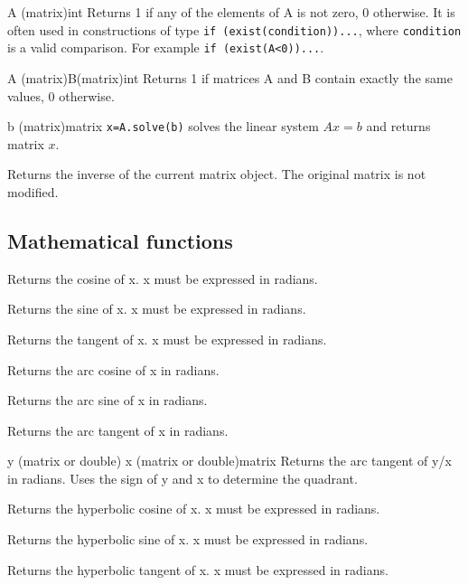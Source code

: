 {A (matrix)}{int}
{Returns 1 if any of the elements of A is not zero, 0 otherwise. It is often used in constructions
of type \texttt{if (exist(condition))...}, where \texttt{condition} is a valid comparison. For example
\texttt{if (exist(A<0))...}.}

{A (matrix)\newline B(matrix)}{int}
{Returns 1 if matrices A and B contain exactly the same values, 0 otherwise.}

{b (matrix)}{matrix}
{\texttt{x=A.solve(b)} solves the linear system $Ax=b$ and returns matrix $x$.}

{Returns the inverse of the current matrix object. The original matrix is not modified.}

\subsection{Mathematical functions}

{Returns the cosine of x. x must be expressed in radians.}

{Returns the sine of x. x must be expressed in radians.}

{Returns the tangent of x. x must be expressed in radians.}

{Returns the arc cosine of x in radians.}

{Returns the arc sine of x in radians.}

{Returns the arc tangent of x in radians.}

{y (matrix or double)\newline
x (matrix or double)}{matrix}
{Returns the arc tangent of y/x in radians. Uses the sign of y and x to determine the quadrant.}

{Returns the hyperbolic cosine of x. x must be expressed in radians.}

{Returns the hyperbolic sine of x. x must be expressed in radians.}

{Returns the hyperbolic tangent of x. x must be expressed in radians.}

